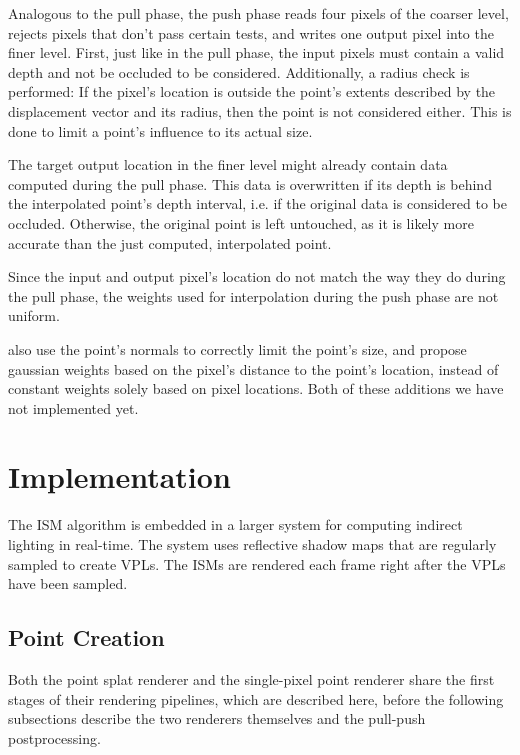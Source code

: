 Analogous to the pull phase, the push phase reads four pixels of the coarser level, rejects pixels that don't pass certain tests, and writes one output pixel into the finer level. First, just like in the pull phase, the input pixels must contain a valid depth and not be occluded to be considered. Additionally, a radius check is performed: If the pixel's location is outside the point's extents described by the displacement vector and its radius, then the point is not considered either. This is done to limit a point's influence to its actual size.

The target output location in the finer level might already contain data computed during the pull phase. This data is overwritten if its depth is behind the interpolated point's depth interval, i.e. if the original data is considered to be occluded. Otherwise, the original point is left untouched, as it is likely more accurate than the just computed, interpolated point.

Since the input and output pixel's location do not match the way they do during the pull phase, the weights used for interpolation during the push phase are not uniform.

 \cite{Marroquim:2007:reconstruction} also use the point's normals to correctly limit the point's size, and \cite{Marroquim:2008:reconstruction2} propose gaussian weights based on the pixel's distance to the point's location, instead of constant weights solely based on pixel locations. Both of these additions we have not implemented yet.







 \section{Implementation}
 \label{sec:impl}

The ISM algorithm is embedded in a larger system for computing indirect lighting in real-time. The system uses reflective shadow maps \cite{Dachsbacher:2005:RSM} that are regularly sampled to create VPLs. The ISMs are rendered each frame right after the VPLs have been sampled.

 \subsection{Point Creation}
 \label{sec:impl:pointCreation}

 Both the point splat renderer and the single-pixel point renderer share the first stages of their rendering pipelines, which are described here, before the following subsections describe the two renderers themselves and the pull-push postprocessing.


